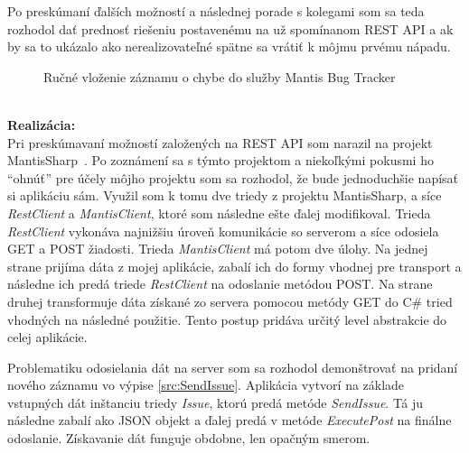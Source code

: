 \documentclass[slovak, bachelorpractice]{diploma}
\begin{document}
Po preskúmaní ďalších možností a následnej porade s kolegami som sa teda rozhodol dať prednosť riešeniu postavenému na už spomínanom REST API a ak by sa to ukázalo ako nerealizovateľné spätne sa vrátiť k môjmu prvému nápadu.
\begin{figure}[!htbp]
	\centering
	\caption{Ručné vloženie záznamu o chybe do služby Mantis Bug Tracker}
	\label{pic:Mantis}
\end{figure} \\
\textbf{Realizácia:} \\ Pri preskúmavaní možností založených na REST API som narazil na projekt \mbox{MantisSharp \cite{MantisSharp}}. Po zoznámení sa s týmto projektom a niekoľkými pokusmi ho \enquote{ohnúť} pre účely môjho projektu som sa rozhodol, že bude jednoduchšie napísať si aplikáciu sám. Využil som k tomu dve triedy z projektu MantisSharp, a síce \textit{RestClient} a \textit{MantisClient}, ktoré som následne ešte ďalej modifikoval. Trieda \textit{RestClient} vykonáva najnižšiu úroveň komunikácie so serverom a síce odosiela GET a POST žiadosti. Trieda \textit{MantisClient} má potom dve úlohy. Na jednej strane prijíma dáta z mojej aplikácie, zabalí ich do formy vhodnej pre transport a následne ich predá triede \textit{RestClient} na odoslanie metódou POST. Na strane druhej transformuje dáta získané zo servera pomocou metódy GET do C\# tried vhodných na následné použitie. Tento postup pridáva určitý level abstrakcie do celej aplikácie.

Problematiku odosielania dát na server som sa rozhodol demonštrovať na pridaní nového záznamu vo výpise \ref{src:SendIssue}. Aplikácia vytvorí na základe vstupných dát inštanciu triedy \textit{Issue}, ktorú predá metóde \textit{SendIssue}. Tá ju následne zabalí ako JSON objekt a ďalej predá v metóde \textit{ExecutePost} na finálne odoslanie. Získavanie dát funguje obdobne, len opačným smerom. 
\end{document}
